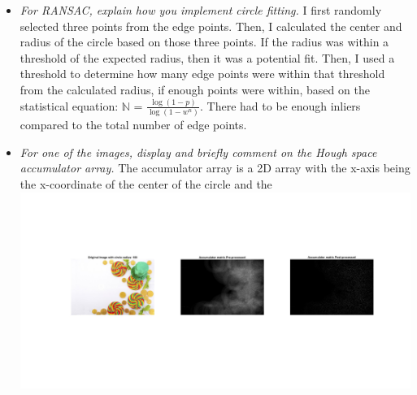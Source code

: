 \documentclass[11pt]{article}
\begin{document}
\begin{itemize}
        \item \textit{For RANSAC, explain how you implement circle fitting.}\newline
        I first randomly selected three points from the edge points. Then, I calculated the center and radius of the
        circle based on those three points. If the radius was within a threshold of the expected radius, then it was
        a potential fit. Then, I used a threshold to determine how many edge points were within that threshold from
        the calculated radius, if enough points were within, based on the statistical equation:
        $\mathbb{N}$ = $\frac{\log(1 - p)}{\log(1 - w^n)}$. There had to be enough inliers compared to the total
        number of edge points.\newline

        \item \textit{For one of the images, display and briefly comment on the Hough space accumulator array.}\newline
        The accumulator array is a 2D array with the x-axis being the x-coordinate of the center of the circle and the
        \includegraphics[width=\textwidth]{Output Pictures/hough_accumulator}\newline


\end{itemize}
\end{document}
